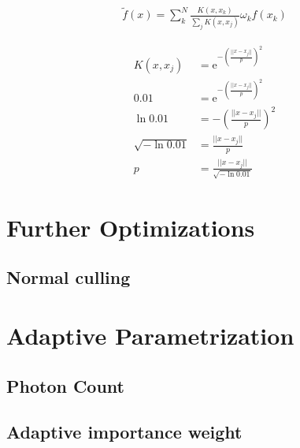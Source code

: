 \begin{align}\label{eq:ckernelreg}
\widetilde{f}(x) = \sum_{k}^{N}\frac{K(x,x_k)}{\sum\nolimits_{j}K(x, x_j)}\omega_kf(x_k)
\end{align}


\begin{align}
K(x, x_j)&=\mathrm{e}^{-\left(\frac{||x-x_j||}{p}\right)^2} \\
0.01 &= \mathrm{e}^{-\left(\frac{||x-x_j||}{p}\right)^2} \\
\ln{0.01} &= -\left(\frac{||x-x_j||}{p}\right)^2 \\
\sqrt{-\ln{0.01}} &= \frac{||x-x_j||}{p} \\
p &= \frac{||x-x_j||}{\sqrt{-\ln{0.01}}}
\end{align}


\section{Further Optimizations}



\subsection{Normal culling}






\section{Adaptive Parametrization}

\subsection{Photon Count}

\subsection{Adaptive importance weight}



